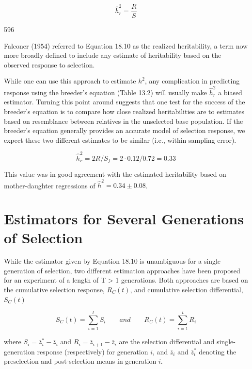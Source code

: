 \documentclass{article}
\begin{document}
\begin{equation}
\widehat{h}_{r}^{2}=\frac{R}{S}
\tag{18.10}
\label{eq:18_10}
\end{equation}

596

Falconer (1954) referred to Equation 18.10 as the realized heritability, a term now more broadly defined to include any estimate of heritability based on the observed response to selection.

While one can use this approach to estimate  $ h^2 $, any complication in predicting response using the breeder's equation (Table 13.2) will usually make  $ \widehat{h}_r^2 $ a biased estimator. Turning this point around suggests that one test for the success of the breeder's equation is to compare how close realized heritabilities are to estimates based on resemblance between relatives in the unselected base population. If the breeder's equation generally provides an accurate model of selection response, we expect these two different estimates to be similar (i.e., within sampling error).

\begin{equation}
\widehat{h}_{r}^{2}=2R/S_{f}=2\cdot0.12/0.72=0.33
\end{equation}

This value was in good agreement with the estimated heritability based on mother-daughter regressions of  $ \widehat{h}^{2}=0.34\pm0.08 $.

\section{Estimators for Several Generations of Selection}
While the estimator given by Equation 18.10 is unambiguous for a single generation of selection, two different estimation approaches have been proposed for an experiment of a length of T > 1 generations. Both approaches are based on the cumulative selection response,  $ R_{C}(t) $, and cumulative selection differential,  $ S_{C}(t) $

\begin{equation}
S_{C}(t)=\sum_{i=1}^{t}S_{i}\qquad and\qquad R_{C}(t)=\sum_{i=1}^{t}R_{i}
\tag{18.11}
\label{eq:18_11}
\end{equation}

where  $ S_i = \overline{z}_i^* - \overline{z}_i $ and  $ R_i = \overline{z}_{i+1} - \overline{z}_i $ are the selection differential and single-generation response (respectively) for generation  $ i $, and  $ \overline{z}_i $ and  $ \overline{z}_i^* $ denoting the preselection and post-selection means in generation  $ i $.
\end{document}
